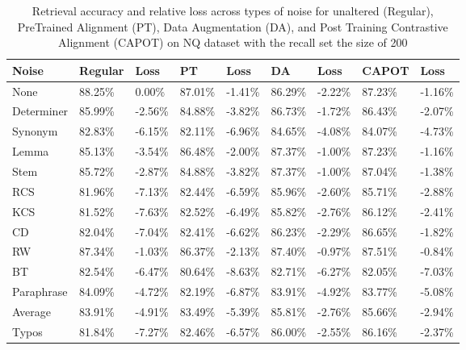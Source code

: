 \begin{table*}[!ht]
    \centering
    \begin{tabular}{|l|l|l|l|l|l|l|l|l|}
    \hline
        Noise & Regular & Loss & PT & Loss & DA & Loss & CAPOT & Loss \\ \hline
        None & 88.25\% & 0.00\% & 87.01\% & -1.41\% & 86.29\% & -2.22\% & 87.23\% & -1.16\% \\ \hline
        Determiner & 85.99\% & -2.56\% & 84.88\% & -3.82\% & 86.73\% & -1.72\% & 86.43\% & -2.07\% \\ \hline
        Synonym & 82.83\% & -6.15\% & 82.11\% & -6.96\% & 84.65\% & -4.08\% & 84.07\% & -4.73\% \\ \hline
        Lemma & 85.13\% & -3.54\% & 86.48\% & -2.00\% & 87.37\% & -1.00\% & 87.23\% & -1.16\% \\ \hline
        Stem & 85.72\% & -2.87\% & 84.88\% & -3.82\% & 87.37\% & -1.00\% & 87.04\% & -1.38\% \\ \hline
        RCS & 81.96\% & -7.13\% & 82.44\% & -6.59\% & 85.96\% & -2.60\% & 85.71\% & -2.88\% \\ \hline
        KCS & 81.52\% & -7.63\% & 82.52\% & -6.49\% & 85.82\% & -2.76\% & 86.12\% & -2.41\% \\ \hline
        CD & 82.04\% & -7.04\% & 82.41\% & -6.62\% & 86.23\% & -2.29\% & 86.65\% & -1.82\% \\ \hline
        RW & 87.34\% & -1.03\% & 86.37\% & -2.13\% & 87.40\% & -0.97\% & 87.51\% & -0.84\% \\ \hline
        BT & 82.54\% & -6.47\% & 80.64\% & -8.63\% & 82.71\% & -6.27\% & 82.05\% & -7.03\% \\ \hline
        Paraphrase & 84.09\% & -4.72\% & 82.19\% & -6.87\% & 83.91\% & -4.92\% & 83.77\% & -5.08\% \\ \hline
        Average & 83.91\% & -4.91\% & 83.49\% & -5.39\% & 85.81\% & -2.76\% & 85.66\% & -2.94\% \\ \hline
        Typos & 81.84\% & -7.27\% & 82.46\% & -6.57\% & 86.00\% & -2.55\% & 86.16\% & -2.37\% \\ \hline
    \end{tabular}
    \caption{Retrieval accuracy and relative loss across types of noise for unaltered (Regular), PreTrained Alignment (PT),  Data Augmentation (DA), and Post Training Contrastive Alignment (CAPOT) on NQ dataset with the recall set the size of 200}
    \label{tab:capot-nq-200}
\end{table*}
